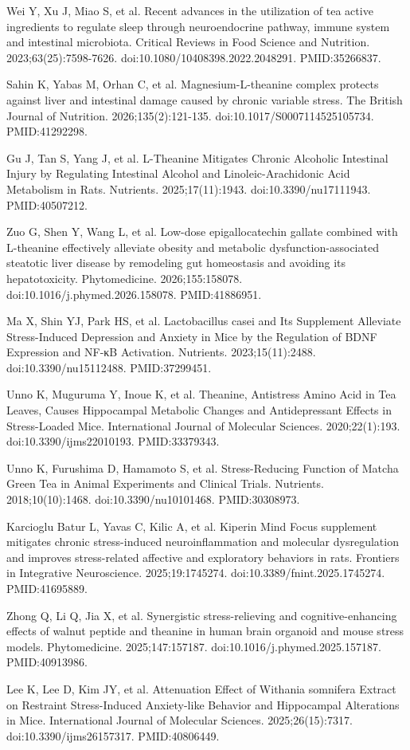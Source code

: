 \documentclass[11pt,oneside]{book}
\newcommand{\reff}[2]{\par\hangindent=7mm\hangafter=1\noindent[#1]\hspace{2mm}#2\par}
\begin{document}
\reff{22}{Wei Y, Xu J, Miao S, et al. Recent advances in the utilization of tea active ingredients to regulate sleep through neuroendocrine pathway, immune system and intestinal microbiota. Critical Reviews in Food Science and Nutrition. 2023;63(25):7598-7626. doi:10.1080/10408398.2022.2048291. PMID:35266837.}
\reff{23}{Sahin K, Yabas M, Orhan C, et al. Magnesium-L-theanine complex protects against liver and intestinal damage caused by chronic variable stress. The British Journal of Nutrition. 2026;135(2):121-135. doi:10.1017/S0007114525105734. PMID:41292298.}
\reff{24}{Gu J, Tan S, Yang J, et al. L-Theanine Mitigates Chronic Alcoholic Intestinal Injury by Regulating Intestinal Alcohol and Linoleic-Arachidonic Acid Metabolism in Rats. Nutrients. 2025;17(11):1943. doi:10.3390/nu17111943. PMID:40507212.}
\reff{25}{Zuo G, Shen Y, Wang L, et al. Low-dose epigallocatechin gallate combined with L-theanine effectively alleviate obesity and metabolic dysfunction-associated steatotic liver disease by remodeling gut homeostasis and avoiding its hepatotoxicity. Phytomedicine. 2026;155:158078. doi:10.1016/j.phymed.2026.158078. PMID:41886951.}
\reff{26}{Ma X, Shin YJ, Park HS, et al. Lactobacillus casei and Its Supplement Alleviate Stress-Induced Depression and Anxiety in Mice by the Regulation of BDNF Expression and NF-κB Activation. Nutrients. 2023;15(11):2488. doi:10.3390/nu15112488. PMID:37299451.}
\reff{27}{Unno K, Muguruma Y, Inoue K, et al. Theanine, Antistress Amino Acid in Tea Leaves, Causes Hippocampal Metabolic Changes and Antidepressant Effects in Stress-Loaded Mice. International Journal of Molecular Sciences. 2020;22(1):193. doi:10.3390/ijms22010193. PMID:33379343.}
\reff{28}{Unno K, Furushima D, Hamamoto S, et al. Stress-Reducing Function of Matcha Green Tea in Animal Experiments and Clinical Trials. Nutrients. 2018;10(10):1468. doi:10.3390/nu10101468. PMID:30308973.}
\reff{29}{Karcioglu Batur L, Yavas C, Kilic A, et al. Kiperin Mind Focus supplement mitigates chronic stress-induced neuroinflammation and molecular dysregulation and improves stress-related affective and exploratory behaviors in rats. Frontiers in Integrative Neuroscience. 2025;19:1745274. doi:10.3389/fnint.2025.1745274. PMID:41695889.}
\reff{30}{Zhong Q, Li Q, Jia X, et al. Synergistic stress-relieving and cognitive-enhancing effects of walnut peptide and theanine in human brain organoid and mouse stress models. Phytomedicine. 2025;147:157187. doi:10.1016/j.phymed.2025.157187. PMID:40913986.}
\reff{31}{Lee K, Lee D, Kim JY, et al. Attenuation Effect of Withania somnifera Extract on Restraint Stress-Induced Anxiety-like Behavior and Hippocampal Alterations in Mice. International Journal of Molecular Sciences. 2025;26(15):7317. doi:10.3390/ijms26157317. PMID:40806449.}
\end{document}
